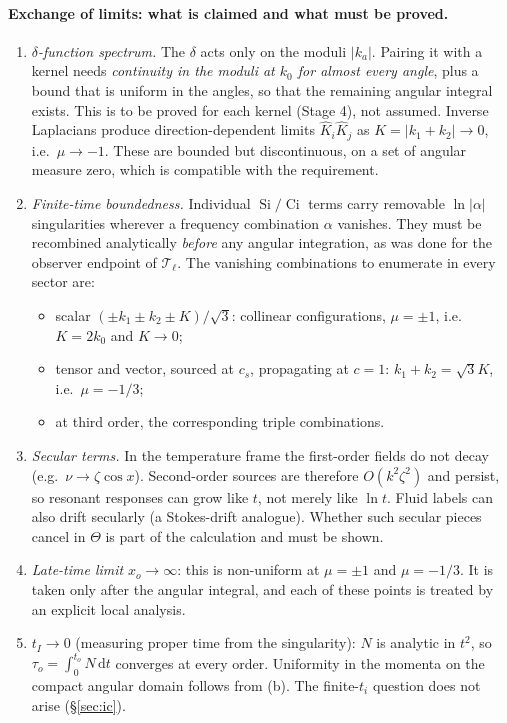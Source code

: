 \documentclass[11pt]{article}
\theoremstyle{definition}
\theoremstyle{remark}
\newcommand{\dd}{\mathrm{d}}
\begin{document}
\paragraph{Exchange of limits: what is claimed and what must be proved.}
\begin{enumerate}
\item[(a)] \emph{$\delta$-function spectrum.} The $\delta$ acts only on the
moduli $|k_a|$. Pairing it with a kernel needs \emph{continuity in the
moduli at $k_0$ for almost every angle}, plus a bound that is uniform in the
angles, so that the remaining angular integral exists. This is to be proved
for each kernel (Stage 4), not assumed. Inverse Laplacians produce
direction-dependent limits $\hat K_i\hat K_j$ as $K=|k_1+k_2|\to0$, i.e.\
$\mu\to-1$. These are bounded but discontinuous, on a set of angular measure
zero, which is compatible with the requirement.
\item[(b)] \emph{Finite-time boundedness.} Individual
$\operatorname{Si}/\operatorname{Ci}$ terms carry removable $\ln|\alpha|$
singularities wherever a frequency combination $\alpha$ vanishes. They must
be recombined analytically \emph{before} any angular integration, as was
done for the observer endpoint of $\mathcal T_\ell$. The vanishing
combinations to enumerate in every sector are:
\begin{itemize}
\item scalar $(\pm k_1\pm k_2\pm K)/\sqrt3$: collinear configurations,
$\mu=\pm1$, i.e.\ $K=2k_0$ and $K\to0$;
\item tensor and vector, sourced at $c_s$, propagating at $c=1$:
$k_1+k_2=\sqrt3K$, i.e.\ $\mu=-1/3$;
\item at third order, the corresponding triple combinations.
\end{itemize}
\item[(c)] \emph{Secular terms.} In the temperature frame the first-order
fields do not decay (e.g.\ $\nu\to\zeta\cos x$). Second-order sources are
therefore $O(k^2\zeta^2)$ and persist, so resonant responses can grow like
$t$, not merely like $\ln t$. Fluid labels can also drift secularly (a
Stokes-drift analogue). Whether such secular pieces cancel in $\Theta$ is
part of the calculation and must be shown.
\item[(d)] \emph{Late-time limit} $x_o\to\infty$: this is non-uniform at
$\mu=\pm1$ and $\mu=-1/3$. It is taken only after the angular integral, and
each of these points is treated by an explicit local analysis.
\item[(e)] $t_I\to0$ (measuring proper time from the singularity): $N$ is
analytic in $t^2$, so $\tau_o=\int_0^{t_o}N\,\dd t$ converges at every order.
Uniformity in the momenta on the compact angular domain follows from (b).
The finite-$t_i$ question does not arise (\S\ref{sec:ic}).
\end{enumerate}
\end{document}
